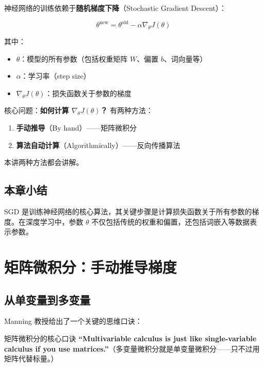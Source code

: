 \documentclass[a4paper]{article}
\begin{document}
神经网络的训练依赖于\textbf{随机梯度下降}（Stochastic Gradient Descent）：





$$\theta^{\text{new}} = \theta^{\text{old}} - \alpha \nabla_\theta J(\theta)$$

其中：
\begin{itemize}
    \item $\theta$：模型的所有参数（包括权重矩阵 $W$、偏置 $b$、词向量等）
    \item $\alpha$：学习率（step size）
    \item $\nabla_\theta J(\theta)$：损失函数关于参数的梯度
\end{itemize}

核心问题：\textbf{如何计算 $\nabla_\theta J(\theta)$？} 有两种方法：
\begin{enumerate}
    \item \textbf{手动推导}（By hand）——矩阵微积分
    \item \textbf{算法自动计算}（Algorithmically）——反向传播算法
\end{enumerate}

本讲两种方法都会讲解。

\subsection{本章小结}

SGD 是训练神经网络的核心算法，其关键步骤是计算损失函数关于所有参数的梯度。在深度学习中，参数 $\theta$ 不仅包括传统的权重和偏置，还包括词嵌入等数据表示参数。


\section{矩阵微积分：手动推导梯度}

\subsection{从单变量到多变量}

Manning 教授给出了一个关键的思维口诀：

\begin{importantbox}{矩阵微积分的核心口诀}
\textbf{``Multivariable calculus is just like single-variable calculus if you use matrices.''}（多变量微积分就是单变量微积分——只不过用矩阵代替标量。）
\end{importantbox}
\end{document}
